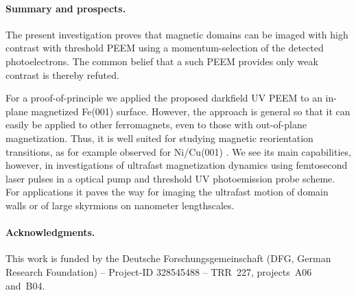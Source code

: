\documentclass[prl,twocolumn,floatfix]{revtex4-2}
\begin{document}


\paragraph{Summary and prospects.} The present investigation proves that magnetic domains can be imaged with high contrast with threshold PEEM using a momentum-selection of the detected photoelectrons. The common belief that a such PEEM provides only weak contrast is thereby refuted.

For a proof-of-principle we applied the proposed darkfield UV PEEM to an in-plane magnetized Fe(001) surface. However, the approach is general so that it can easily be applied to other ferromagnets, even to those with out-of-plane magnetization. Thus, it is well suited for studying magnetic reorientation transitions, as for example observed for Ni/Cu(001) . We see its main capabilities, however, in investigations of ultrafast magnetization dynamics using femtosecond laser pulses in a optical pump and threshold UV photoemission probe scheme. For applications it paves the way for imaging the ultrafast motion of domain walls  or of large skyrmions on nanometer lengthscales.

\paragraph{Acknowledgments.} This work is funded by the Deutsche Forschungsgemeinschaft (DFG, German Research Foundation) -- Project-ID 328545488 -- TRR~227, projects~A06 and~B04.

% 


\listoftodos
\end{document}
